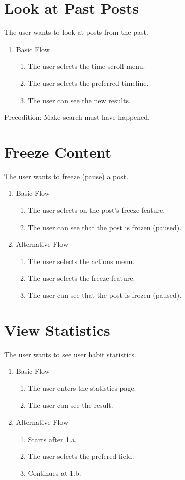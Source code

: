 \section{Look at Past Posts}
The user wants to look at posts from the past.
\begin{enumerate}
\item Basic Flow
  \begin{enumerate}
    \item The user selects the time-scroll menu.
    \item The user selects the preferred timeline.
    \item The user can see the new results.
  \end{enumerate}
\end{enumerate}
Precodition: \newline
Make search must have happened.

\section{Freeze Content}
The user wants to freeze (pause) a post.
\begin{enumerate}
  \item Basic Flow
  \begin{enumerate}
    \item The user selects on the post's freeze feature.
    \item The user can see that the post is frozen (paused).
  \end{enumerate}
  \item Alternative Flow
  \begin{enumerate}
    \item The user selects the actions menu.
    \item The user selects the freeze feature.
    \item The user can see that the post is frozen (paused).
  \end{enumerate}
\end{enumerate}

\section{View Statistics}
The user wants to see user habit statistics.
\begin{enumerate}
  \item Basic Flow
  \begin{enumerate}
    \item The user enters the statistics page.
    \item The user can see the result.
  \end{enumerate}
  \item Alternative Flow
  \begin{enumerate}
    \item Starts after 1.a.
    \item The user selects the prefered field.
    \item Continues at 1.b.
  \end{enumerate}
\end{enumerate}

